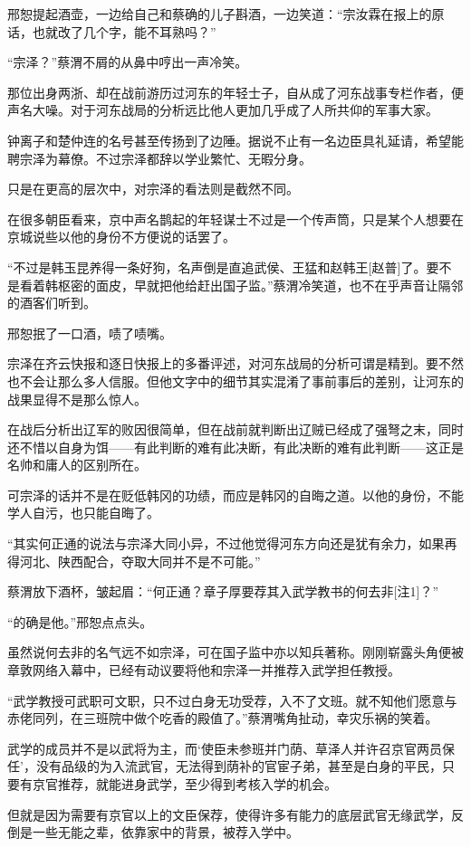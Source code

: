 邢恕提起酒壶，一边给自己和蔡确的儿子斟酒，一边笑道：“宗汝霖在报上的原话，也就改了几个字，能不耳熟吗？”

“宗泽？”蔡渭不屑的从鼻中哼出一声冷笑。

那位出身两浙、却在战前游历过河东的年轻士子，自从成了河东战事专栏作者，便声名大噪。对于河东战局的分析远比他人更加几乎成了人所共仰的军事大家。

钟离子和楚仲连的名号甚至传扬到了边陲。据说不止有一名边臣具礼延请，希望能聘宗泽为幕僚。不过宗泽都辞以学业繁忙、无暇分身。

只是在更高的层次中，对宗泽的看法则是截然不同。

在很多朝臣看来，京中声名鹊起的年轻谋士不过是一个传声筒，只是某个人想要在京城说些以他的身份不方便说的话罢了。

“不过是韩玉昆养得一条好狗，名声倒是直追武侯、王猛和赵韩王[赵普]了。要不是看着韩枢密的面皮，早就把他给赶出国子监。”蔡渭冷笑道，也不在乎声音让隔邻的酒客们听到。

邢恕抿了一口酒，啧了啧嘴。

宗泽在齐云快报和逐日快报上的多番评述，对河东战局的分析可谓是精到。要不然也不会让那么多人信服。但他文字中的细节其实混淆了事前事后的差别，让河东的战果显得不是那么惊人。

在战后分析出辽军的败因很简单，但在战前就判断出辽贼已经成了强弩之末，同时还不惜以自身为饵——有此判断的难有此决断，有此决断的难有此判断——这正是名帅和庸人的区别所在。

可宗泽的话并不是在贬低韩冈的功绩，而应是韩冈的自晦之道。以他的身份，不能学人自污，也只能自晦了。

“其实何正通的说法与宗泽大同小异，不过他觉得河东方向还是犹有余力，如果再得河北、陕西配合，夺取大同并不是不可能。”

蔡渭放下酒杯，皱起眉：“何正通？章子厚要荐其入武学教书的何去非[注1]？”

“的确是他。”邢恕点点头。

虽然说何去非的名气远不如宗泽，可在国子监中亦以知兵著称。刚刚崭露头角便被章敦网络入幕中，已经有动议要将他和宗泽一并推荐入武学担任教授。

“武学教授可武职可文职，只不过白身无功受荐，入不了文班。就不知他们愿意与赤佬同列，在三班院中做个吃香的殿值了。”蔡渭嘴角扯动，幸灾乐祸的笑着。

武学的成员并不是以武将为主，而‘使臣未参班并门荫、草泽人并许召京官两员保任’，没有品级的为入流武官，无法得到荫补的官宦子弟，甚至是白身的平民，只要有京官推荐，就能进身武学，至少得到考核入学的机会。

但就是因为需要有京官以上的文臣保荐，使得许多有能力的底层武官无缘武学，反倒是一些无能之辈，依靠家中的背景，被荐入学中。

